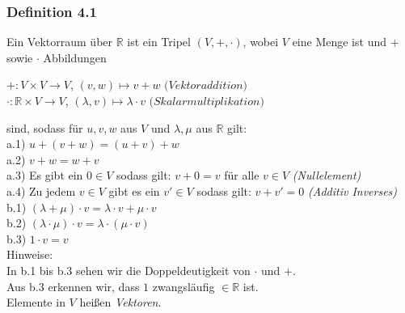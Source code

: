\documentclass{article}
\begin{document}
\subsubsection*{Definition 4.1}
Ein Vektorraum über $\mathbb{R}$ ist ein Tripel $(V, +, \cdot )$, wobei $V$ eine Menge ist und + sowie $\cdot$ Abbildungen \\
\begin{center}
    $+: V \times V \rightarrow V$, $(v,w) \mapsto v+w$ $\textit{(Vektoraddition)}$ \\
    $\cdot: \mathbb{R} \times V \rightarrow V$, $(\lambda, v) \mapsto \lambda \cdot v$ $\textit{(Skalarmultiplikation)}$ \\
\end{center}
sind, sodass für $u,v,w$ aus $V$ und $\lambda, \mu$ aus $\mathbb{R}$ gilt: \\
a.1) $u+(v+w) = (u+v)+w$ \\
a.2) $v+w = w+v$ \\
a.3) Es gibt ein $0 \in V$ sodass gilt: $v+0 = v$ für alle $v \in V$ \textit{(Nullelement)} \\
a.4) Zu jedem $v \in V$ gibt es ein $v' \in V$ sodass gilt: $v+v' = 0$ \textit{(Additiv Inverses)} \\
b.1) $(\lambda + \mu) \cdot v = \lambda \cdot v + \mu \cdot v$ \\
b.2) $(\lambda \cdot \mu) \cdot v = \lambda \cdot (\mu \cdot v)$ \\
b.3) $1 \cdot v = v$ \\
Hinweise: \\
In b.1 bis b.3 sehen wir die Doppeldeutigkeit von $\cdot$ und $+$. \\
Aus b.3 erkennen wir, dass $1$ zwangsläufig $ \in \mathbb{R}$ ist. \\
Elemente in $V$ heißen \textit{Vektoren}. \\
\end{document}
